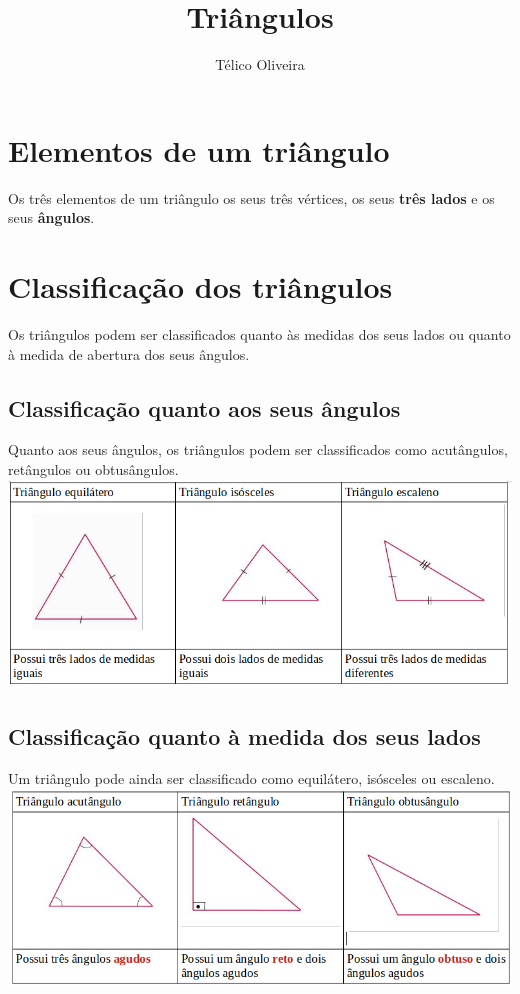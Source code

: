 \documentclass{article}
\title{Triângulos}
\author{Télico Oliveira}
\begin{document}
\maketitle
\section{Elementos de um triângulo}
Os três elementos de um triângulo os seus \textbf{}{três vértices}, os seus \textbf{três lados} e os seus \textbf{ângulos}. 
\section{Classificação dos triângulos}
Os triângulos podem ser classificados quanto às medidas dos seus lados ou quanto à medida de abertura dos seus ângulos. 
\subsection{Classificação quanto aos seus ângulos}
Quanto aos seus ângulos, os triângulos podem ser classificados como acutângulos, retângulos ou obtusângulos.  
\\
\includegraphics[scale = 0.5]{tabela1.png}


\subsection{Classificação quanto à medida dos seus lados}
Um triângulo pode ainda ser classificado como equilátero, isósceles ou escaleno. 
\\
\includegraphics[scale = 0.5]{tabela2.png}
\end{document}
